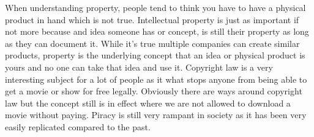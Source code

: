 \documentclass[12pt]{article}
\begin{document}
    \indent When understanding property, people tend to think you have to have a physical product in hand which is not true. Intellectual property is just as important if not more because and idea someone has or concept, is still their property as long as they can document it. While it's true multiple companies can create similar products, property is the underlying concept that an idea or physical product is yours and no one can take that idea and use it. Copyright law is a very interesting subject for a lot of people as it what stops anyone from being able to get a movie or show for free legally. Obviously there are ways around copyright law but the concept still is in effect where we are not allowed to download a movie without paying. Piracy is still very rampant in society as it has been very easily replicated compared to the past.
\newpage
\onehalfspacing
\end{document}
